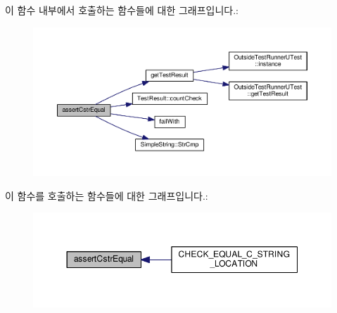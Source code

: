 이 함수 내부에서 호출하는 함수들에 대한 그래프입니다.\+:
\nopagebreak
\begin{figure}[H]
\begin{center}
\leavevmode
\includegraphics[width=350pt]{class_utest_shell_aabd5eeb6ba32e6101c0ec8e058a2518c_cgraph}
\end{center}
\end{figure}




이 함수를 호출하는 함수들에 대한 그래프입니다.\+:
\nopagebreak
\begin{figure}[H]
\begin{center}
\leavevmode
\includegraphics[width=350pt]{class_utest_shell_aabd5eeb6ba32e6101c0ec8e058a2518c_icgraph}
\end{center}
\end{figure}


